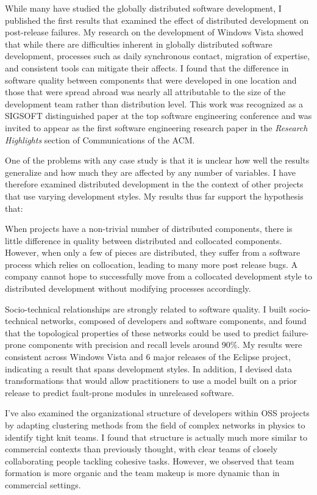 \documentclass[10pt]{article}
\begin{document}
\begin{small}
While many have studied the globally distributed software development, I
published the first results that examined the effect of distributed development
on post-release failures.  My research on the development of Windows Vista
showed that while there are difficulties inherent in globally distributed
software development, processes such as daily synchronous contact, migration of
expertise, and consistent tools can mitigate their affects.  I found that the
difference in software quality between components that were developed in one
location and those that were spread abroad was nearly all attributable to the
size of the development team rather than distribution level.  This work was
recognized as a SIGSOFT distinguished paper at the top software engineering
conference and was invited to appear as the first software engineering research
paper in the \emph{Research Highlights} section of Communications of the ACM.

One of the problems with any case study is that it is unclear how well the
results generalize and how much they are affected by any number of variables.
I have therefore examined distributed development in the the context of other
projects that use varying development styles.  My results thus far support
the hypothesis that:

When projects have a non-trivial number of distributed components, there is
little difference in quality between distributed and collocated components.
However, when only a few of pieces are distributed, they suffer from a software
process which relies on collocation, leading to many more post release bugs.  A
company cannot hope to successfully move from a collocated development style to
distributed development without modifying processes accordingly.

Socio-technical relationships are strongly related to software quality.  I
built socio-technical networks, composed of developers and software components,
and found that the topological properties of these networks could be used to
predict failure-prone components with precision and recall levels around 90\%.
My results were consistent across Windows Vista and 6 major releases of the
Eclipse project, indicating a result that spans development styles.  In
addition, I devised data transformations that would allow practitioners to use
a model built on a prior release to predict fault-prone modules in unreleased
software.

I've also examined the organizational structure of developers within OSS
projects by adapting clustering methods from the field of complex networks in
physics to identify tight knit teams.  I found that structure is actually much
more similar to commercial contexts than previously thought, with clear teams
of closely collaborating people tackling cohesive tasks. However, we observed
that team formation is more organic and the team makeup is more dynamic than in
commercial settings.


\end{small}
\end{document}
